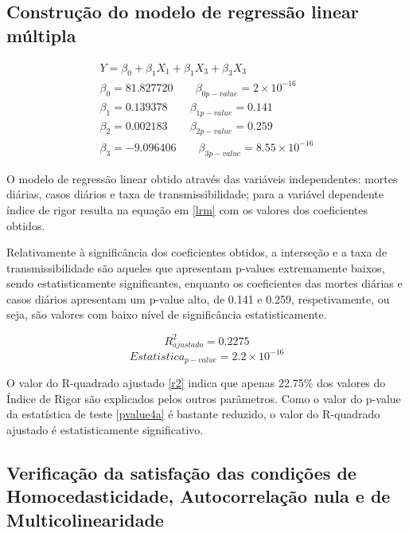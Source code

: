 \documentclass[conference]{IEEEtran}
\begin{document}
\subsection{Construção do modelo de regressão linear múltipla}

\begin{equation}
\begin{array}{l}
	Y=\beta _{0}+\beta _{1}X_{1}+\beta _{1}X_{3}+\beta _{3}X_{3} \\
	\beta _{0}=81.827720 \qquad \beta _{0 p-value}=2\times 10^{-16} \\
	\beta _{1}=0.139378 \qquad \beta _{1 p-value}=0.141 \\
	\beta _{2}=0.002183 \qquad \beta _{2 p-value}=0.259 \\
	\beta _{3}=-9.096406 \qquad \beta _{3 p-value}=8.55\times 10^{-16}
\end{array}\label{lrm}
\end{equation}

O modelo de regressão linear obtido através das variáveis independentes: mortes diárias, casos diários e taxa de transmissibilidade; para a variável dependente índice de rigor resulta na equação em \eqref{lrm} com os valores dos coeficientes obtidos.

Relativamente à significância dos coeficientes obtidos, a interseção e a taxa de transmissibilidade são aqueles que apresentam p-values extremamente  baixos, sendo estatisticamente significantes, enquanto os coeficientes das mortes diárias e casos diários apresentam um p-value alto, de 0.141 e 0.259, respetivamente, ou seja, são valores com baixo nível de significância estatisticamente.

\begin{equation}
	R^{2}_{ajustado}=0.2275 \label{r2}
\end{equation}
\begin{equation}
	Estatistica _{p-value}=2.2\times 10^{-16} \label{pvalue4a}
\end{equation}

O valor do R-quadrado ajustado \eqref{r2} indica que apenas 22.75\% dos valores do Índice de Rigor são explicados pelos outros parâmetros. Como o valor do p-value da estatística de teste \eqref{pvalue4a} é bastante reduzido, o valor do R-quadrado ajustado é estatisticamente significativo.

\subsection{Verificação da satisfação das condições de Homocedasticidade, Autocorrelação nula e de Multicolinearidade}
\end{document}
